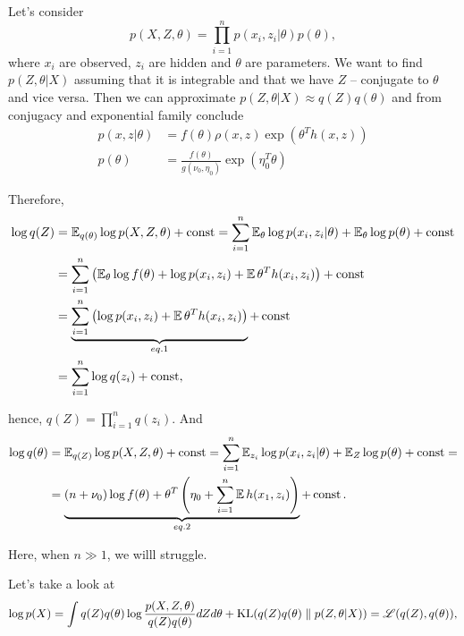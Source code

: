 Let's consider $$p(X, Z, \theta) = \prod_{i = 1}^n p(x_i, z_i | \theta) p(\theta),$$ where $x_i$ are observed, $z_i$ are hidden and $\theta$ are parameters. We want to find $p(Z, \theta | X)$ assuming that it is integrable and that we have $Z$ -- conjugate to $\theta$ and vice versa. Then we can approximate $p(Z, \theta | X) \approx q(Z) q(\theta)$ and from conjugacy and exponential family conclude
\begin{equation*}
    \begin{aligned}
        p(x, z | \theta) &= f(\theta) \rho(x, z) \exp (\theta^T h(x, z)) \\ 
        p(\theta) &= \frac{f(\theta)}{g(\nu_0, \eta_0)} \exp (\eta_0^T \theta)  
    \end{aligned}
\end{equation*}

Therefore, 
\begin{equation*}
    \begin{aligned}
        \log  q(Z) &= \operatorname{\mathbb{E}}_{q(\theta)} \log p(X, Z, \theta) + \operatorname{const} = \sum_{i = 1}^n \operatorname{\mathbb{E}}_{\theta} \log p(x_i, z_i | \theta) + \operatorname{\mathbb{E}}_\theta\log p(\theta) + \operatorname{const} \\ 
        &= \sum_{i = 1}^n \left( \operatorname{\mathbb{E}}_\theta \log f(\theta) + \log p(x_i, z_i) + \operatorname{\mathbb{E}} \theta^T h(x_i, z_i)\right) + \operatorname{const} \\ 
        &= \underbrace{\sum_{i = 1}^n \left(\log p(x_i, z_i) + \operatorname{\mathbb{E}} \theta^T h(x_i, z_i) \right)}_{eq. 1} + \operatorname{const} \\ 
        &= \sum_{i = 1}^n \log q(z_i) + \operatorname{const},
    \end{aligned}
\end{equation*}

hence, $q(Z) = \prod_{i = 1}^n q(z_i)$. And 
\begin{equation*}
    \begin{aligned}
           \log q(\theta) &= \operatorname{\mathbb{E}}_{q(Z)} \log p(X, Z, \theta) + \operatorname{const} = \sum_{i = 1}^n \operatorname{\mathbb{E}}_{z_i} \log p(x_i, z_i | \theta) + \operatorname{\mathbb{E}}_{Z} \log p(\theta) + \operatorname{const} = \\
        &= \underbrace{(n + \nu_0) \log f(\theta) + \theta^T \left( \eta_0 + \sum_{i = 1}^n \operatorname{\mathbb{E}} h(x_1, z_i) \right)}_{eq. 2} + \operatorname{const}.
    \end{aligned}
\end{equation*}

\begin{eremark}
       Here, when $n \gg 1$, we willl struggle. 
\end{eremark}

Let's take a look at 
\begin{equation*}
    \log p(X) = \int q(Z) q(\theta) \log \frac{p(X, Z, \theta)}{q(Z) q(\theta)} dZ d\theta + \operatorname{KL}(q(Z) q(\theta) \parallel p(Z, \theta | X)) = \operatorname{\mathscr{L}}(q(Z), q(\theta)), 
\end{equation*}

